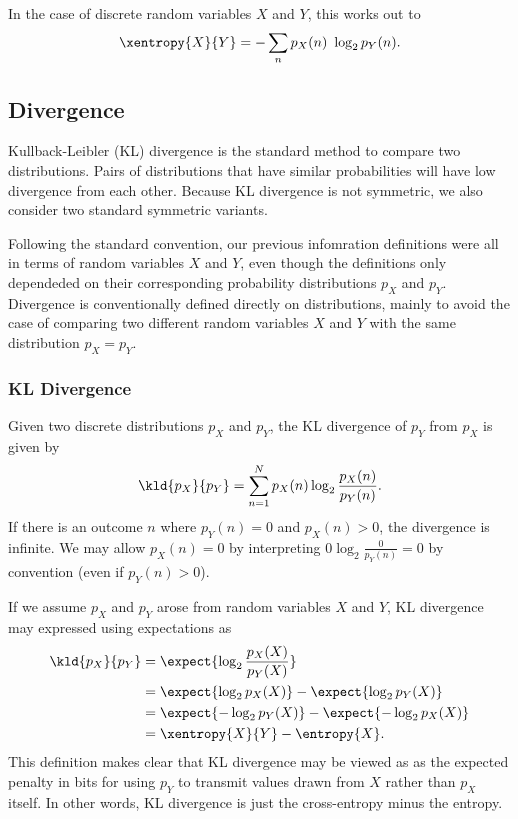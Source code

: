 In the case of discrete random variables $X$ and $Y$, this works out to
%
\begin{equation}
\xentropy{X}{Y} = - \sum_n p_X(n) \ \log_2 p_Y(n).
\end{equation}
%



\subsection{Divergence}\label{section:stats-divergence}

Kullback-Leibler (KL) divergence is the standard method to compare two
distributions.  Pairs of distributions that have similar probabilities
will have low divergence from each other.  Because KL divergence is
not symmetric, we also consider two standard symmetric variants.

Following the standard convention, our previous infomration
definitions were all in terms of random variables $X$ and $Y$, even
though the definitions only dependeded on their corresponding
probability distributions $p_X$ and $p_Y$.  Divergence is
conventionally defined directly on distributions, mainly to avoid the
case of comparing two different random variables $X$ and $Y$ with the
same distribution $p_X = p_Y$.

\subsubsection{KL Divergence}

Given two discrete distributions $p_X$ and $p_Y$, the KL divergence of
$p_Y$ from $p_X$ is given by
%
\begin{equation}
\kld{p_X}{p_Y}
= \sum_{n=1}^N p_X(n) \log_2 \frac{p_X(n)}{p_Y(n)}.
\end{equation}
%
If there is an outcome $n$ where $p_Y(n) = 0$ and $p_X(n) > 0$, the
divergence is infinite.  We may allow $p_X(n) = 0$ by interpreting $0
\log_2 \frac{0}{p_Y(n)} = 0$ by convention (even if $p_Y(n) > 0$).

If we assume $p_X$ and $p_Y$ arose from random variables $X$ and $Y$,
KL divergence may expressed using expectations as
%
\begin{align}
\kld{p_X}{p_Y} 
&= \expect{\log_2 \frac{p_X(X)}{p_Y(X)}}
\\
&= \expect{\log_2 p_X(X)} - \expect{\log_2 p_Y(X)}
\\
&= \expect{-\log_2 p_Y(X)} - \expect{-\log_2 p_X(X)}
\\
&= \xentropy{X}{Y} - \entropy{X}.
\end{align}
%
This definition makes clear that KL divergence may be viewed as as the
expected penalty in bits for using $p_Y$ to transmit values drawn from
$X$ rather than $p_X$ itself.  In other words, KL divergence is just
the cross-entropy minus the entropy.

